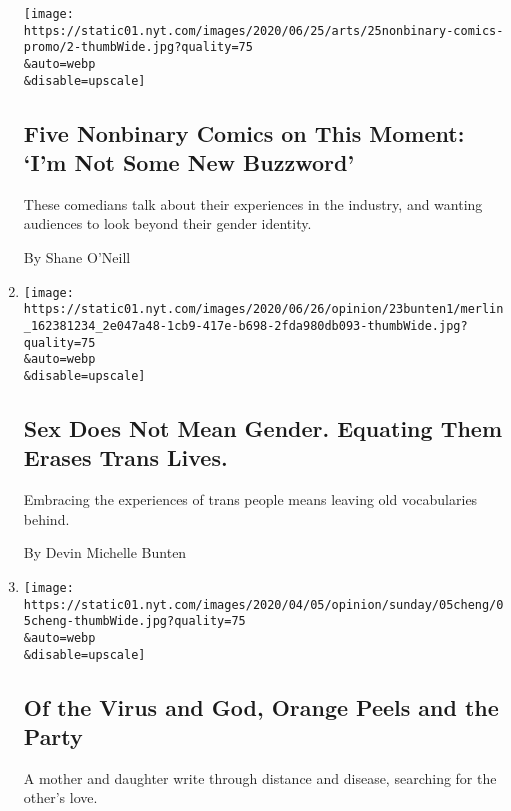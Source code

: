 \begin{enumerate}
  \texttt{[image: https://static01.nyt.com/images/2020/06/25/arts/25nonbinary-comics-promo/2-thumbWide.jpg?quality=75\\\&auto=webp\\\&disable=upscale]}

  \hypertarget{five-nonbinary-comics-on-this-moment-im-not-some-new-buzzword}{%
  \subsection{Five Nonbinary Comics on This Moment: `I'm Not Some New
  Buzzword'}\label{five-nonbinary-comics-on-this-moment-im-not-some-new-buzzword}}

  These comedians talk about their experiences in the industry, and
  wanting audiences to look beyond their gender identity.

  By Shane O'Neill
\item
  \href{/2020/06/23/opinion/trans-gender-language-trump.html}{}

  \texttt{[image: https://static01.nyt.com/images/2020/06/26/opinion/23bunten1/merlin\_162381234\_2e047a48-1cb9-417e-b698-2fda980db093-thumbWide.jpg?quality=75\\\&auto=webp\\\&disable=upscale]}

  \hypertarget{sex-does-not-mean-gender-equating-them-erases-trans-lives}{%
  \subsection{Sex Does Not Mean Gender. Equating Them Erases Trans
  Lives.}\label{sex-does-not-mean-gender-equating-them-erases-trans-lives}}

  Embracing the experiences of trans people means leaving old
  vocabularies behind.

  By Devin Michelle Bunten
\item
  \href{/2020/04/03/opinion/sunday/coronavirus-china-US.html}{}

  \texttt{[image: https://static01.nyt.com/images/2020/04/05/opinion/sunday/05cheng/05cheng-thumbWide.jpg?quality=75\\\&auto=webp\\\&disable=upscale]}

  \hypertarget{of-the-virus-and-god-orange-peels-and-the-party}{%
  \subsection{Of the Virus and God, Orange Peels and the
  Party}\label{of-the-virus-and-god-orange-peels-and-the-party}}

  A mother and daughter write through distance and disease, searching
  for the other's love.


\end{enumerate}
